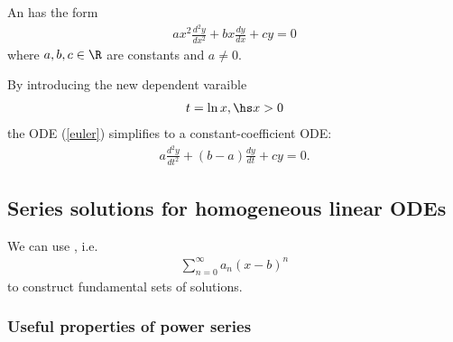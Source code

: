\documentclass{article}
\begin{document}
\begin{definition}
    An  has the form
    \begin{align}
        \label{euler}
        ax^2\frac{d^2y}{dx^2} + bx\frac{dy}{dx} + cy = 0
    \end{align}
    where $a,b,c\in\R$ are constants and $a\not=0$.
\end{definition}

\begin{theorem}
    By introducing the new dependent varaible
    \begin{align*}
        t=\ln x,\hs x>0
    \end{align*}
    the ODE (\ref{euler}) simplifies to a constant-coefficient ODE:
    \begin{align*}
        a\frac{d^2y}{dt^2}+(b-a)\frac{dy}{dt}+cy=0. 
    \end{align*}
\end{theorem}


\subsection{Series solutions for homogeneous linear ODEs}


\begin{lemma}
    We can use , i.e.
    \begin{align}
        \label{pseries}
        \sum_{n=0}^\infty a_n (x-b)^n
    \end{align}
    to construct fundamental sets of solutions.
\end{lemma}

\subsubsection{Useful properties of power series}
\end{document}

